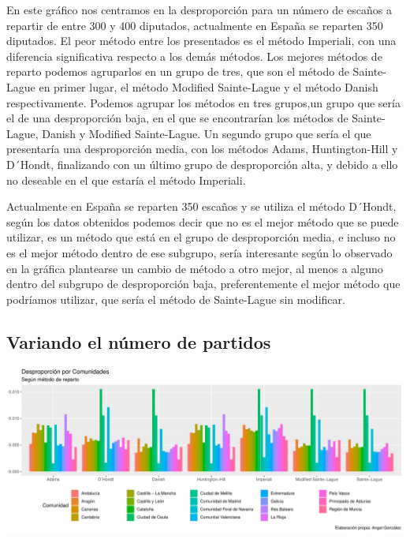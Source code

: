 \documentclass[12pt,a4paper,]{book}
\numberwithin{dummy}{section}
\theoremstyle{ocrenumbox}
\theoremstyle{blacknumex}
\theoremstyle{blacknumbox}
\theoremstyle{ocrenum}
\theoremstyle{ocrenum}
\begin{document}
En este gráfico nos centramos en la desproporción para un número de
escaños a repartir de entre 300 y 400 diputados, actualmente en España
se reparten 350 diputados. El peor método entre los presentados es el
método Imperiali, con una diferencia significativa respecto a los demás
métodos. Los mejores métodos de reparto podemos agruparlos en un grupo
de tres, que son el método de Sainte-Lague en primer lugar, el método
Modified Sainte-Lague y el método Danish respectivamente. Podemos
agrupar los métodos en tres grupos,un grupo que sería el de una
desproporción baja, en el que se encontrarían los métodos de
Sainte-Lague, Danish y Modified Sainte-Lague. Un segundo grupo que sería
el que presentaría una desproporción media, con los métodos Adams,
Huntington-Hill y D´Hondt, finalizando con un último grupo de
desproporción alta, y debido a ello no deseable en el que estaría el
método Imperiali.

Actualmente en España se reparten 350 escaños y se utiliza el método
D´Hondt, según los datos obtenidos podemos decir que no es el mejor
método que se puede utilizar, es un método que está en el grupo de
desproporción media, e incluso no es el mejor método dentro de ese
subgrupo, sería interesante según lo observado en la gráfica plantearse
un cambio de método a otro mejor, al menos a alguno dentro del subgrupo
de desproporción baja, preferentemente el mejor método que podríamos
utilizar, que sería el método de Sainte-Lague sin modificar.

\hypertarget{variando-el-nuxfamero-de-partidos}{%
\subsection{Variando el número de
partidos}\label{variando-el-nuxfamero-de-partidos}}

\begin{center}\includegraphics[width=0.95\linewidth]{figurasR/unnamed-chunk-63-1} \end{center}
\end{document}
